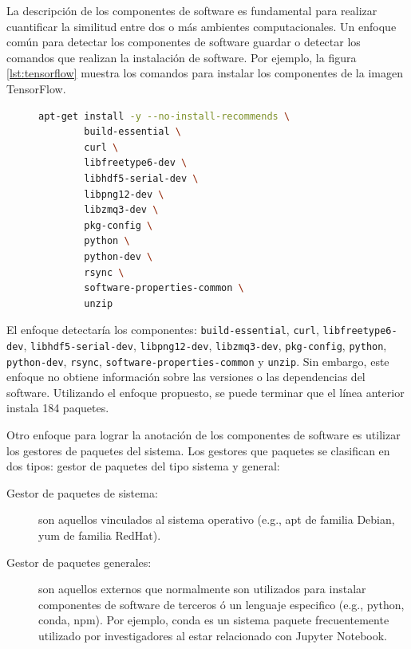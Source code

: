 La descripción de los componentes de software es fundamental para realizar cuantificar la similitud entre dos o más ambientes computacionales.
Un enfoque común para detectar los componentes de software guardar o detectar los comandos que realizan la instalación de software. Por ejemplo, la figura \ref{lst:tensorflow} muestra los comandos para instalar los componentes de la imagen TensorFlow. 
\begin{figure}
	\begin{lstlisting}[caption={Ejemplo de instalación de dependencias para la imagen TensorFlow},label={lst:tensorflow},language=bash]
apt-get install -y --no-install-recommends \
        build-essential \
        curl \
        libfreetype6-dev \
        libhdf5-serial-dev \
        libpng12-dev \
        libzmq3-dev \
        pkg-config \
        python \
        python-dev \
        rsync \
        software-properties-common \
        unzip	
\end{lstlisting}

\end{figure}


El enfoque detectaría los componentes: \verb|build-essential|, \verb|curl|, \verb|libfreetype6-dev|, \verb|libhdf5-serial-dev|, \verb|libpng12-dev|, \verb|libzmq3-dev|, \verb|pkg-config|, \verb|python|, \verb|python-dev|, \verb|rsync|, \verb|software-properties-common| y  \verb|unzip|. Sin embargo, este enfoque no obtiene información sobre las versiones o las dependencias del software. Utilizando el  enfoque propuesto, se puede terminar que el línea anterior instala 184 paquetes.



Otro enfoque  para lograr la anotación de los componentes de software es utilizar los gestores de paquetes del sistema. Los gestores que paquetes se clasifican en dos tipos: gestor de paquetes del tipo sistema y general:

\begin{description}
	\item  [Gestor de paquetes de sistema:] son aquellos vinculados al sistema operativo (e.g., apt de familia Debian, yum de familia RedHat).
	\item [Gestor de paquetes generales:] son aquellos externos que normalmente son utilizados para instalar componentes de software de terceros ó un lenguaje especifico (e.g., python, conda, npm). Por ejemplo, conda es un sistema paquete frecuentemente utilizado por investigadores al estar relacionado con Jupyter Notebook.
\end{description}


